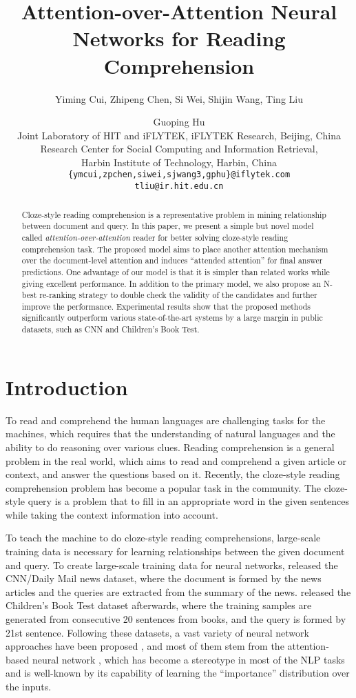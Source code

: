 \documentclass[11pt,a4paper]{article}
\title{Attention-over-Attention Neural Networks for Reading Comprehension}
\author{Yiming Cui, Zhipeng Chen, Si Wei, Shijin Wang, Ting Liu \and Guoping Hu\\
{Joint Laboratory of HIT and iFLYTEK, iFLYTEK Research, Beijing, China}\\
{Research Center for Social Computing and Information Retrieval,}\\
{Harbin Institute of Technology, Harbin, China}\\
{\tt\{ymcui,zpchen,siwei,sjwang3,gphu\}@iflytek.com}\\  
{\tt tliu@ir.hit.edu.cn}\\
}
\date{}
\begin{document}
\maketitle

\begin{abstract}
Cloze-style reading comprehension is a representative problem in mining relationship between document and query.
In this paper, we present a simple but novel model called {\em attention-over-attention} reader for better solving cloze-style reading comprehension task.
The proposed model aims to place another attention mechanism over the document-level attention and induces ``attended attention'' for final answer predictions.
One advantage of our model is that it is simpler than related works while giving excellent performance.
In addition to the primary model, we also propose an N-best re-ranking strategy to double check the validity of the candidates and further improve the performance.
Experimental results show that the proposed methods significantly outperform various state-of-the-art systems by a large margin in public datasets, such as CNN and Children's Book Test.
\end{abstract}


\section{Introduction}\label{introduction}
To read and comprehend the human languages are challenging tasks for the machines, which requires that the understanding of natural languages and the ability to do reasoning over various clues. 
Reading comprehension is a general problem in the real world, which aims to read and comprehend a given article or context, and answer the questions based on it. 
Recently, the cloze-style reading comprehension problem has become a popular task in the community.
The cloze-style query \cite{taylor-etal-1953} is a problem that to fill in an appropriate word in the given sentences while taking the context information into account.

To teach the machine to do cloze-style reading comprehensions, large-scale training data is necessary for learning relationships between the given document and query.
To create large-scale training data for neural networks,  released the CNN/Daily Mail news dataset, where the document is formed by the news articles and the queries are extracted from the summary of the news. 
 released the Children's Book Test dataset afterwards, where the training samples are generated from consecutive 20 sentences from books, and the query is formed by 21st sentence. 
Following these datasets, a vast variety of neural network approaches have been proposed \citep{kadlec-etal-2016,cui-etal-2016,chen-etal-2016,dhingra-etal-2016,sordoni-etal-2016,trischler-etal-2016,seo-etal-2016,xiong-etal-2016}, and most of them stem from the attention-based neural network \cite{bahdanau-etal-2014}, which has become a stereotype in most of the NLP tasks and is well-known by its capability of learning the ``importance'' distribution over the inputs.
\end{document}
